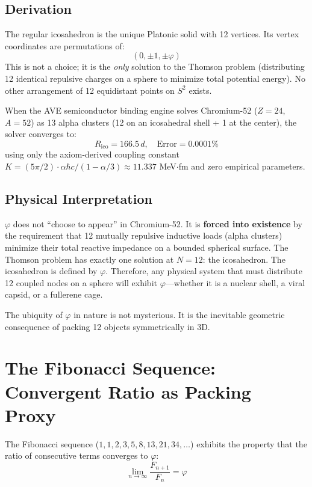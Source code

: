 \subsection{Derivation}
The regular icosahedron is the unique Platonic solid with 12 vertices. Its vertex coordinates are permutations of:
\begin{equation}
    (0, \pm 1, \pm \varphi)
\end{equation}
This is not a choice; it is the \textit{only} solution to the Thomson problem (distributing 12 identical repulsive charges on a sphere to minimize total potential energy). No other arrangement of 12 equidistant points on $S^2$ exists.

When the AVE semiconductor binding engine solves Chromium-52 ($Z=24$, $A=52$) as 13 alpha clusters (12 on an icosahedral shell + 1 at the center), the solver converges to:
\begin{equation}
    R_{\text{ico}} = 166.5\,d, \quad \text{Error} = 0.0001\%
\end{equation}
using only the axiom-derived coupling constant $K = (5\pi/2) \cdot \alpha\hbar c / (1 - \alpha/3) \approx 11.337$ MeV$\cdot$fm and zero empirical parameters.

\subsection{Physical Interpretation}
$\varphi$ does not ``choose to appear'' in Chromium-52. It is \textbf{forced into existence} by the requirement that 12 mutually repulsive inductive loads (alpha clusters) minimize their total reactive impedance on a bounded spherical surface. The Thomson problem has exactly one solution at $N=12$: the icosahedron. The icosahedron is defined by $\varphi$. Therefore, any physical system that must distribute 12 coupled nodes on a sphere will exhibit $\varphi$---whether it is a nuclear shell, a viral capsid, or a fullerene cage.

The ubiquity of $\varphi$ in nature is not mysterious. It is the inevitable geometric consequence of packing 12 objects symmetrically in 3D.

\section{The Fibonacci Sequence: Convergent Ratio as Packing Proxy}
\label{sec:fibonacci_packing}

The Fibonacci sequence ($1, 1, 2, 3, 5, 8, 13, 21, 34, \ldots$) exhibits the property that the ratio of consecutive terms converges to $\varphi$:
\begin{equation}
    \lim_{n \to \infty} \frac{F_{n+1}}{F_n} = \varphi
\end{equation}

